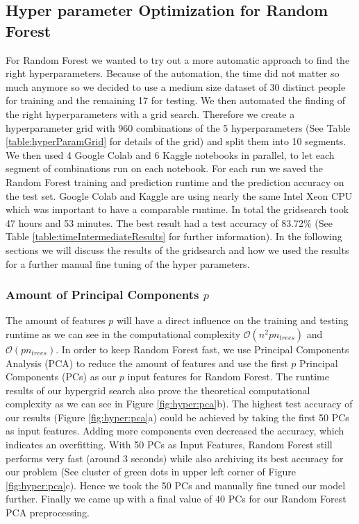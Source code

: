 \documentclass[conference]{IEEEtran}
\begin{document}
\subsection{Hyper parameter Optimization for Random Forest}\label{sec:hyper:rf}
\textcolor{til}{
    For Random Forest we wanted to try out a more automatic approach to find the right hyperparameters. Because of the automation, the time did not matter so much anymore so we decided to use a medium size dataset of 30 distinct people for training and the remaining 17 for testing. We then automated the finding of the right hyperparameters with a grid search. Therefore we create a hyperparameter grid with 960 combinations of the 5 hyperparameters (See Table \ref{table:hyperParamGrid} for details of the grid) and split them into 10 segments. We then used 4 Google Colab and 6 Kaggle notebooks in parallel, to let each segment of combinations run on each notebook. For each run we saved the Random Forest training and prediction runtime and the prediction accuracy on the test set. Google Colab and Kaggle are using nearly the same Intel Xeon CPU which was important to have a comparable runtime. In total the gridsearch took 47 hours and 53 minutes. The best result had a test accuracy of 83.72\% (See Table \ref{table:timeIntermediateResults} for further information). In the following sections we will discuss the results of the gridsearch and how we used the results for a further manual fine tuning of the hyper parameters. 
\subsubsection{Amount of Principal Components $p$}
The amount of features $p$ will have a direct influence on the training and testing runtime as we can see in the computational complexity $\mathcal{O}(n^2pn_{trees})$ and $\mathcal{O}(pn_{trees})$. In order to keep Random Forest fast, we use Principal Components Analysis (PCA) to reduce the amount of features and use the first $p$ Principal Components (PCs) as our $p$ input features for Random Forest. The runtime results of our hypergrid search also prove the theoretical computational complexity as we can see in Figure \ref{fig:hyper:pca}b). The highest test accuracy of our results (Figure \ref{fig:hyper:pca}a) could be achieved by taking the first 50 PCs as input features. Adding more components even decreased the accuracy, which indicates an overfitting. With 50 PCs as Input Features, Random Forest still performs very fast (around 3 seconds) while also archiving its best accuracy for our problem (See cluster of green dots in upper left corner of Figure \ref{fig:hyper:pca}c). Hence we took the 50 PCs and manually fine tuned our model further. Finally we came up with a final value of 40 PCs for our Random Forest PCA preprocessing.
}
\end{document}
